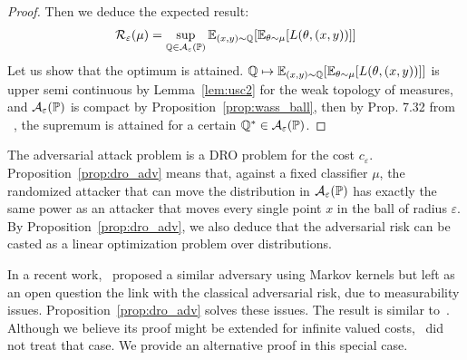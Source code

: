 \begin{proof}
Then we deduce the expected result:
\begin{align*}
\risk_\varepsilon(\mu)= \sup_{\QQ\in\mathcal{A}_\varepsilon(\PP)}\mathbb{E}_{(x,y)\sim\QQ}\left[\mathbb{E}_{\theta\sim\mu}\left[\loss(\theta,(x,y))\right]\right]
\end{align*}
Let us show that the optimum is attained. $\QQ\mapsto\mathbb{E}_{(x,y)\sim\QQ}\left[\mathbb{E}_{\theta\sim\mu}\left[\loss(\theta,(x,y))\right]\right]$ is upper semi continuous by Lemma~\ref{lem:usc2} for the weak topology of measures, and $\mathcal{A}_\varepsilon(\mathbb{P})$ is compact by Proposition~\ref{prop:wass_ball}, then by Prop. 7.32 from ~\citep{bertsekas2004stochastic}, the supremum is attained for a certain $\mathbb{Q}^*\in\mathcal{A}_\varepsilon(\mathbb{P})$. 

\end{proof}

The adversarial attack problem is a DRO problem for the cost $c_\varepsilon$.
Proposition~\ref{prop:dro_adv} means that, against a fixed classifier $\mu$, the randomized attacker that can move the distribution in $\mathcal{A}_\varepsilon(\mathbb{P})$ has exactly the same power as an attacker that moves every single point $x$ in the ball of radius $\varepsilon$.  By Proposition~\ref{prop:dro_adv}, we also  deduce that the adversarial risk can be casted as a linear optimization problem over distributions.

\begin{rmq}
  In a recent work,~\citep{pydi2019adversarial} proposed a similar adversary using Markov kernels but left as an open question the link with the classical adversarial risk, due to measurability issues. Proposition~\ref{prop:dro_adv} solves these issues. The result is similar to~\citep{blanchet2019quantifying}. Although we believe its proof might be extended for infinite valued costs,~\citep{blanchet2019quantifying} did not treat that case. We provide an alternative proof in this special case. 
\end{rmq}



